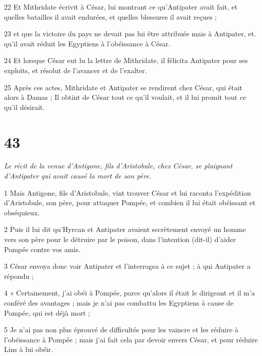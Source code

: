 \par 22 Et Mithridate écrivit à César, lui montrant ce qu'Antipater avait fait, et quelles batailles il avait endurées, et quelles blessures il avait reçues ;

\par 23 et que la victoire du pays ne devait pas lui être attribuée mais à Antipater, et. qu'il avait réduit les Egyptiens à l'obéissance à César.

\par 24 Et lorsque César eut lu la lettre de Mithridate, il félicita Antipater pour ses exploits, et résolut de l'avancer et de l'exalter.

\par 25 Après ces actes, Mithridate et Antipater se rendirent chez César, qui était alors à Damas ; Il obtint de César tout ce qu'il voulait, et il lui promit tout ce qu'il désirait.

\chapter{43}

\par \textit{Le récit de la venue d'Antigone, fils d'Aristobule, chez César, se plaignant d'Antipater qui avait causé la mort de son père.}

\par 1 Mais Antigone, fils d'Aristobule, vint trouver César et lui raconta l'expédition d'Aristobule, son père, pour attaquer Pompée, et combien il lui était obéissant et obséquieux.

\par 2 Puis il lui dit qu'Hyrcan et Antipater avaient secrètement envoyé un homme vers son père pour le détruire par le poison, dans l'intention (dit-il) d'aider Pompée contre vos amis.

\par 3 César envoya donc voir Antipater et l'interrogea à ce sujet ; à qui Antipater a répondu ;

\par 4 « Certainement, j'ai obéi à Pompée, parce qu'alors il était le dirigeant et il m'a conféré des avantages ; mais je n'ai pas combattu les Egyptiens à cause de Pompée, qui est déjà mort ;

\par 5 Je n'ai pas non plus éprouvé de difficultés pour les vaincre et les réduire à l'obéissance à Pompée ; mais j’ai fait cela par devoir envers César, et pour réduire Lins à lui obéir.

